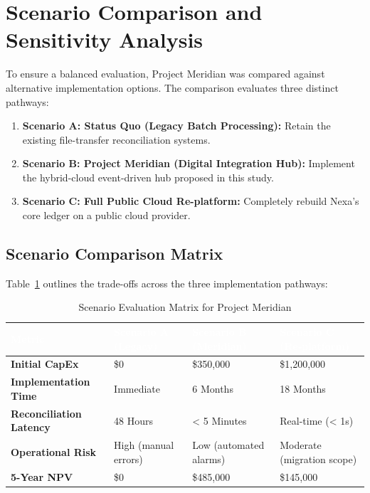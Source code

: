 \section{Scenario Comparison and Sensitivity Analysis}
\label{sec:comparison}

To ensure a balanced evaluation, Project Meridian was compared against alternative implementation options. The comparison evaluates three distinct pathways:
\begin{enumerate}[leftmargin=1.5em]
  \item \textbf{Scenario A: Status Quo (Legacy Batch Processing):} Retain the existing file-transfer reconciliation systems.
  \item \textbf{Scenario B: Project Meridian (Digital Integration Hub):} Implement the hybrid-cloud event-driven hub proposed in this study.
  \item \textbf{Scenario C: Full Public Cloud Re-platform:} Completely rebuild Nexa's core ledger on a public cloud provider.
\end{enumerate}

\vspace{1em}
\subsection{Scenario Comparison Matrix}
Table~\ref{tab:comparison} outlines the trade-offs across the three implementation pathways:

\vspace{0.8em}
\begin{table}[H]
\centering
\small
\begin{tabularx}{\textwidth}{@{} >{\bfseries}l X X X @{}}
\toprule
\rowcolor{primary}
\textcolor{white}{\textbf{Metric}} & \textcolor{white}{\textbf{Scenario A (Legacy)}} & \textcolor{white}{\textbf{Scenario B (Meridian)}} & \textcolor{white}{\textbf{Scenario C (Re-platform)}} \\
\midrule
Initial CapEx & \$0 & \$350,000 & \$1,200,000 \\
Implementation Time & Immediate & 6 Months & 18 Months \\
Reconciliation Latency & 48 Hours & < 5 Minutes & Real-time (< 1s) \\
Operational Risk & High (manual errors) & Low (automated alarms) & Moderate (migration scope) \\
5-Year NPV & \$0 & \$485,000 & \$145,000 \\
\bottomrule
\end{tabularx}
\caption{Scenario Evaluation Matrix for Project Meridian}
\label{tab:comparison}
\end{table}
\vspace{0.8em}

